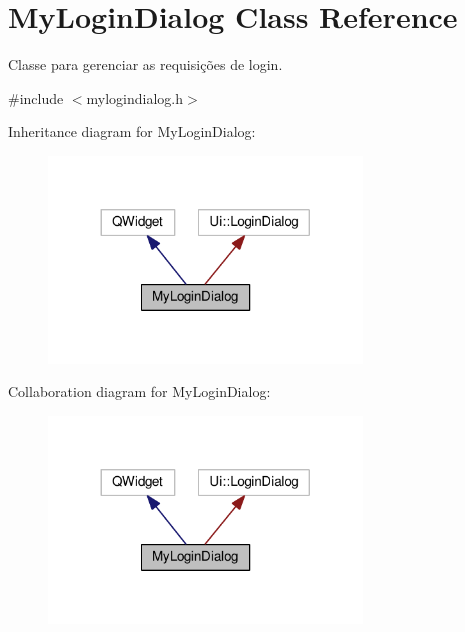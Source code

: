 \hypertarget{classMyLoginDialog}{}\section{My\+Login\+Dialog Class Reference}
\label{classMyLoginDialog}


Classe para gerenciar as requisições de login.  




{\ttfamily \#include $<$mylogindialog.\+h$>$}



Inheritance diagram for My\+Login\+Dialog\+:
\nopagebreak
\begin{figure}[H]
\begin{center}
\leavevmode
\includegraphics[width=236pt]{d5/d81/classMyLoginDialog__inherit__graph}
\end{center}
\end{figure}


Collaboration diagram for My\+Login\+Dialog\+:
\nopagebreak
\begin{figure}[H]
\begin{center}
\leavevmode
\includegraphics[width=236pt]{db/d47/classMyLoginDialog__coll__graph}
\end{center}
\end{figure}
